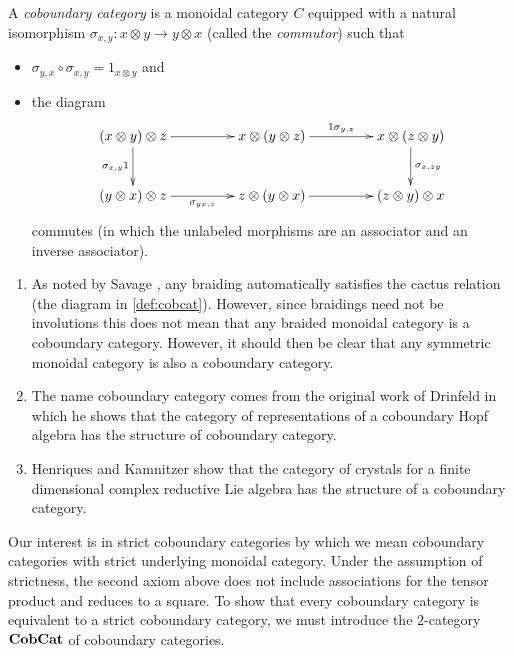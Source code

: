 \begin{Defi}\label{def:cobcat}
A \textit{coboundary category} is a monoidal category $C$ equipped with a natural isomorphism $\sigma_{x,y} \colon x \otimes y \rightarrow y \otimes x$ (called the \textit{commutor}) such that
\begin{itemize}
\item $\sigma_{y,x} \circ \sigma_{x,y} = 1_{x \otimes y}$ and
\item the diagram
  \[
    \xy
      (0,0)*+{(x \otimes y) \otimes z} ="00";
      (35,0)*+{x \otimes (y \otimes z)} ="10";
      (70,0)*+{x \otimes (z \otimes y)} ="20";
      (0,-15)*+{(y \otimes x) \otimes z} ="01";
      (35,-15)*+{z \otimes (y \otimes x)} ="11";
      (70,-15)*+{(z \otimes y )\otimes x} ="21";
      {\ar "00"; "10" };
      {\ar^{1 \sigma_{y,z}} "10"; "20" };
      {\ar^{\sigma_{x,zy}} "20"; "21" };
      {\ar_{\sigma_{x,y}1} "00"; "01" };
      {\ar_{\sigma_{yx,z}} "01"; "11" };
      {\ar "11"; "21" };
    \endxy
  \]
commutes (in which the unlabeled morphisms are an associator and an inverse associator).
\end{itemize}
\end{Defi}

\begin{example}\label{ex:cobcats}
\begin{enumerate}
\item As noted by Savage \cite{savage-braidcob}, any braiding automatically satisfies the cactus relation (the diagram in \cref{def:cobcat}). However, since braidings need not be involutions this does not mean that any braided monoidal category is a coboundary category. However, it should then be clear that any symmetric monoidal category is also a coboundary category.
\item The name coboundary category comes from the original work of Drinfeld \cite{drin-quasihopf} in which he shows that the category of representations of a coboundary Hopf algebra has the structure of coboundary category.
\item Henriques and Kamnitzer \cite{hk-cobound} show that the category of crystals for a finite dimensional complex reductive Lie algebra has the structure of a coboundary category. 
\end{enumerate}
\end{example}

Our interest is in strict coboundary categories by which we mean coboundary categories with strict underlying monoidal category. Under the assumption of strictness, the second axiom above does not include associations for the tensor product and reduces to a square. To show that every coboundary category is equivalent to a strict coboundary category, we must introduce the $2$-category $\mathbf{CobCat}$ of coboundary categories.

